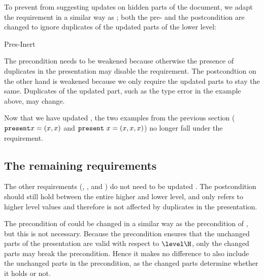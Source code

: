 
%
%

To prevent  from suggesting updates on hidden parts of the document, we adapt the requirement in a similar way as ; both the pre- and the postcondition are changed to ignore duplicates of the updated parts of the lower level:


		{Pres-Inert}

The precondition needs to be weakened because otherwise the presence of duplicates in the presentation may disable the requirement. The postcondtion on the other hand is weakened because we only require the updated parts to stay the same. Duplicates of the updated part, such as the type error in the example above, may change.


Now that we have updated , the two examples from the previous section (${\tt present} x = (x,x)$ and 
${\tt present}~x =(x,x,x)$) no longer fall under the  requirement. 


\subsection{The remaining requirements}

The other requirements (, , and ) do not need to be updated . The postcondition should still hold between the entire higher and lower level, and  only refers to higher level values and therefore is not affected by duplicates in the presentation.

The precondition of  could be changed in a similar way as the precondition of , but this is not necessary. Because the precondition ensures that the unchanged parts of the presentation are valid with respect to $\level\H$, only the changed parts may break the precondition. Hence it makes no difference to also include the unchanged parts in the precondition, as the changed parts determine whether it holds or not.

